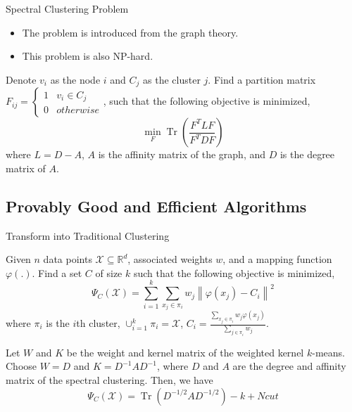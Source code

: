\documentclass{beamer}
\newcommand{\R}{\mathbb{R}}
\newcommand{\norm}[1]{\left\lVert#1\right\rVert}
\begin{document}
\begin{frame}{Spectral Clustering Problem}
	\begin{itemize}
		\item The problem is introduced from the graph theory.
		\item This problem is also NP-hard.
	\end{itemize}
	\begin{definition}
		Denote $v_i$ as the node $i$ and $C_j$ as the cluster $j$. Find a partition matrix $F_{ij} = \begin{cases} 1 & {v_i \in C_j} \\ 0 & {otherwise}
		\end{cases}$, such that the following objective is minimized,
		\begin{equation}
			\min\limits_{F} \operatorname{Tr}(\frac{F^T L F}{F^T D F})
		\end{equation}
		where $L = D-A$, $A$ is the affinity matrix of the graph, and $D$ is the degree matrix of $A$.
	\end{definition}
\end{frame}

\subsection{Provably Good and Efficient Algorithms}

\begin{frame}{Transform into Traditional Clustering}
	\footnotesize{
		\begin{definition}
			Given $n$ data points $\mathcal{X} \subseteq \R^d$, associated weights $w$, and a mapping function $\varphi(.)$. Find a set $C$ of size $k$ such that the following objective is minimized,
			\begin{equation}
			\Psi_C(\mathcal{X}) = \sum_{i=1}^k \sum_{x_j \in \pi_i}w_j \norm{\varphi(x_j)-C_i}^2
			\end{equation}
			where $\pi_i$ is the $i$th cluster, $\cup_{i=1}^k \pi_i = \mathcal{X}$, $C_i = \frac{\sum_{x_j \in \pi_i}w_j \varphi(x_j)}{\sum_{j \in \pi_i}w_j}$.
		\end{definition}
	}
	\footnotesize{
		\begin{lemma}
			Let $W$ and $K$ be the weight and kernel matrix of the weighted kernel $k$-means. Choose $W=D$ and $K=D^{-1}AD^{-1}$, where $D$ and $A$ are the degree and affinity matrix of the spectral clustering. Then, we have
			\begin{equation}
			\Psi_C(\mathcal{X})=\operatorname{Tr}(D^{-1/2}AD^{-1/2})-k+Ncut
			\end{equation}
		\end{lemma}
	}
	
\end{frame}
\end{document}

